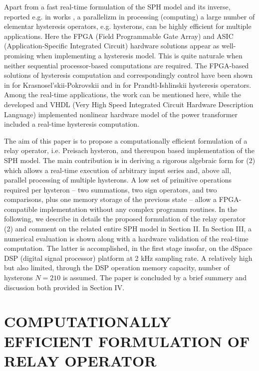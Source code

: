 \documentclass[journal]{IEEEtran}
\begin{document}
Apart from a fast real-time formulation of the SPH model and its
inverse, reported e.g. in works
\cite{davino2005,davino2008,davino2014}, a parallelizm in
processing (computing) a large number of elementar hysteresis
operators, e.g. hysterons, can be highly efficient for multiple
applications. Here the FPGA (Field Programmable Gate Array) and
ASIC (Application-Specific Integrated Circuit) hardware solutions
appear as well-promising when implementing a hysteresis model.
This is quite naturale when neither sequential processor-based
computations are required. The FPGA-based solutions of hysteresis
computation and correspondingly control have been shown in
\cite{tan2008,iyer2009} for Krasnosel'skii-Pokrovskii and in
\cite{Janocha2008} for Prandtl-Ishlinskii hysteresis operators.
Among the real-time applications, the work \cite{Liu2014} can be
mentioned here, while the developed and VHDL (Very High Speed
Integrated Circuit Hardware Description Language) implemented
nonlinear hardware model of the power transformer included a
real-time hysteresis computation.

The aim of this paper is to propose a computationally efficient
formulation of a relay operator, i.e. Preisach hysteron, and
thereupon based implementation of the SPH model. The main
contribution is in deriving a rigorous algebraic form for (2)
which allows a real-time execution of arbitrary input series and,
above all, parallel processing of multiple hysterons. A low set of
primitive operations required per hysteron -- two summations, two
sign operators, and two comparisons, plus one memory storage of
the previous state -- allow a FPGA-compatible implementation
without any complex programm routines. In the following, we
describe in details the proposed formulation of the relay operator
(2) and comment on the related entire SPH model in Section II. In
Section III, a numerical evaluation is shown along with a hardware
validation of the real-time computation. The latter is
accomplished, in the first stage insofar, on the dSpace DSP
(digital signal processor) platform at 2 kHz sampling rate. A
relatively high but also limited, through the DSP operation memory
capacity, number of hysterons $N=210$ is assumed. The paper is
concluded by a brief summery and discussion both provided in
Section IV.



\section{COMPUTATIONALLY EFFICIENT FORMULATION OF RELAY OPERATOR}
\label{sec:2}
\end{document}
